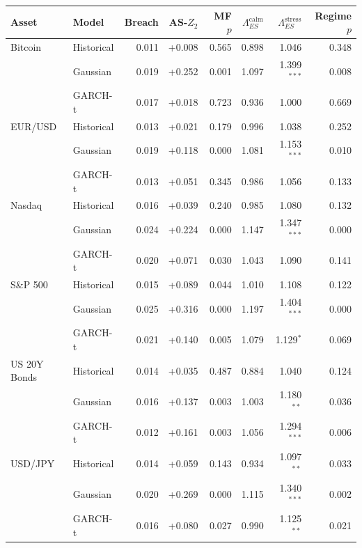 \begin{tabular}{llrrrrrr}
\toprule
Asset & Model & Breach & AS-$Z_2$ & MF $p$ & $\Lambda_{ES}^{\text{calm}}$ & $\Lambda_{ES}^{\text{stress}}$ & Regime $p$ \\
\midrule
Bitcoin & Historical & 0.011 & +0.008 & 0.565 & 0.898 & 1.046 & 0.348 \\
 & Gaussian & 0.019 & +0.252 & 0.001 & 1.097 & 1.399$^{***}$ & 0.008 \\
 & GARCH-t & 0.017 & +0.018 & 0.723 & 0.936 & 1.000 & 0.669 \\
EUR/USD & Historical & 0.013 & +0.021 & 0.179 & 0.996 & 1.038 & 0.252 \\
 & Gaussian & 0.019 & +0.118 & 0.000 & 1.081 & 1.153$^{***}$ & 0.010 \\
 & GARCH-t & 0.013 & +0.051 & 0.345 & 0.986 & 1.056 & 0.133 \\
Nasdaq & Historical & 0.016 & +0.039 & 0.240 & 0.985 & 1.080 & 0.132 \\
 & Gaussian & 0.024 & +0.224 & 0.000 & 1.147 & 1.347$^{***}$ & 0.000 \\
 & GARCH-t & 0.020 & +0.071 & 0.030 & 1.043 & 1.090 & 0.141 \\
S\&P 500 & Historical & 0.015 & +0.089 & 0.044 & 1.010 & 1.108 & 0.122 \\
 & Gaussian & 0.025 & +0.316 & 0.000 & 1.197 & 1.404$^{***}$ & 0.000 \\
 & GARCH-t & 0.021 & +0.140 & 0.005 & 1.079 & 1.129$^{*}$ & 0.069 \\
US 20Y Bonds & Historical & 0.014 & +0.035 & 0.487 & 0.884 & 1.040 & 0.124 \\
 & Gaussian & 0.016 & +0.137 & 0.003 & 1.003 & 1.180$^{**}$ & 0.036 \\
 & GARCH-t & 0.012 & +0.161 & 0.003 & 1.056 & 1.294$^{***}$ & 0.006 \\
USD/JPY & Historical & 0.014 & +0.059 & 0.143 & 0.934 & 1.097$^{**}$ & 0.033 \\
 & Gaussian & 0.020 & +0.269 & 0.000 & 1.115 & 1.340$^{***}$ & 0.002 \\
 & GARCH-t & 0.016 & +0.080 & 0.027 & 0.990 & 1.125$^{**}$ & 0.021 \\
\bottomrule
\end{tabular}